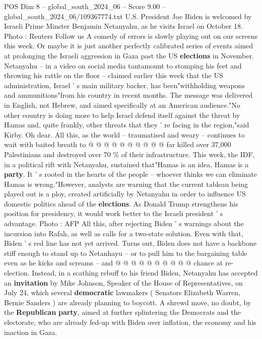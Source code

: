\begin{textsample}{POS Dim 8 – global\_south\_2024\_06 – Score 9.00 – global\_south\_2024\_06/109367774.txt}  \label{ex:f8_pos_209}
U.S.
President Joe Biden is welcomed by Israeli Prime Minster Benjamin Netanyahu, as he visits Israel on October 18.
Photo : Reuters Follow us A comedy of errors is slowly playing out on our screens this week.
Or maybe it is just another perfectly calibrated series of events aimed at prolonging the Israeli aggression in Gaza past the US \textbf{elections} in November.
Netanyahu -- in a video on social media tantamount to stomping his feet and throwing his rattle on the floor -- claimed earlier this week that the US administration, Israel ' s main military backer, has been"withholding weapons and ammunitions"from his country in recent months.
The message was delivered in English, not Hebrew, and aimed specifically at an American audience."No other country is doing more to help Israel defend itself against the threat by Hamas and, quite frankly, other threats that they ' re facing in the region,"said Kirby.
Oh dear.
All this, as the world -- traumatised and weary -- continues to wait with baited breath to @ @ @ @ @ @ @ @ @ @ far killed over 37,000 Palestinians and destroyed over 70 \% of their infrastructure.
This week, the IDF, in a political rift with Netanyahu, sustained that"Hamas is an idea, Hamas is a \textbf{party}.
It ' s rooted in the hearts of the people -- whoever thinks we can eliminate Hamas is wrong."However, analysts are warning that the current tableau being played out is a ploy, created artificially by Netanyahu in order to influence US domestic politics ahead of the \textbf{elections}.
As Donald Trump strengthens his position for presidency, it would work better to the Israeli president ' s advantage.
Photo : AFP All this, after rejecting Biden ' s warnings about the incursion into Rafah, as well as calls for a two-state solution.
Even with that, Biden ' s red line has not yet arrived.
Turns out, Biden does not have a backbone stiff enough to stand up to Netanhayu -- or to pull him to the bargaining table even as he kicks and screams -- and @ @ @ @ @ @ @ @ @ @ chance at re-election.
Instead, in a scathing rebuff to his friend Biden, Netanyahu has accepted an \textbf{invitation} by Mike Johnson, Speaker of the House of Representatives, on July 24, which several \textbf{democratic} lawmakers ( Senators Elizabeth Warren, Bernie Sanders ) are already planning to boycott.
A shrewd move, no doubt, by the \textbf{Republican} \textbf{party}, aimed at further splintering the Democrats and the electorate, who are already fed-up with Biden over inflation, the economy and his inaction in Gaza.

\end{textsample}

